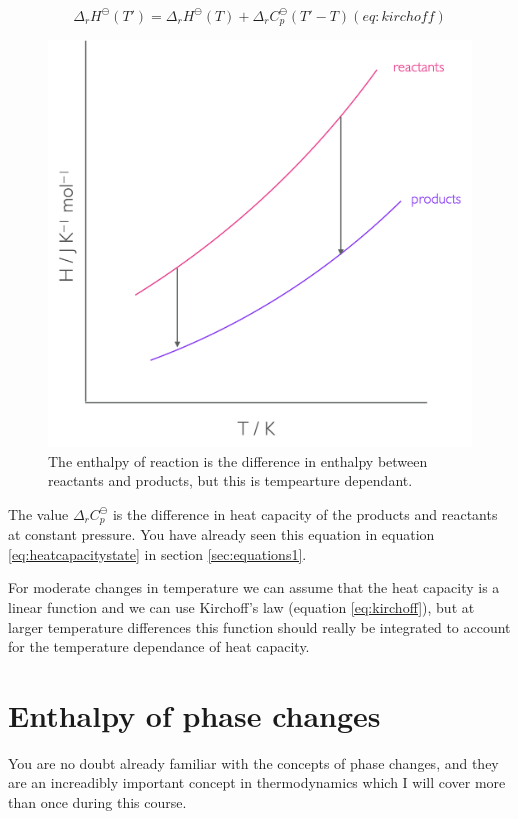 \documentclass[
]{book}
\begin{document}
\begin{equation}
\Delta_r H^{\ominus} (T')=\Delta_r H^{\ominus} (T) + \Delta_r C_p^{\ominus} (T'-T)
(eq:kirchoff)
\end{equation}

\begin{figure}

{\centering \includegraphics[width=0.7\linewidth]{images/enthalpytemp} 

}

\caption{The enthalpy of reaction is the difference in enthalpy between reactants and products, but this is tempearture dependant.}\label{fig:enthalpytemp}
\end{figure}

The value \(\Delta_r C_p^{\ominus}\) is the difference in heat capacity of the products and reactants at constant pressure. You have already seen this equation in equation \eqref{eq:heatcapacitystate} in section \ref{sec:equations1}.

For moderate changes in temperature we can assume that the heat capacity is a linear function and we can use Kirchoff's law (equation \eqref{eq:kirchoff}), but at larger temperature differences this function should really be integrated to account for the temperature dependance of heat capacity.

\hypertarget{enthalpy-of-phase-changes}{%
\section{Enthalpy of phase changes}\label{enthalpy-of-phase-changes}}

You are no doubt already familiar with the concepts of phase changes, and they are an increadibly important concept in thermodynamics which I will cover more than once during this course.
\end{document}
